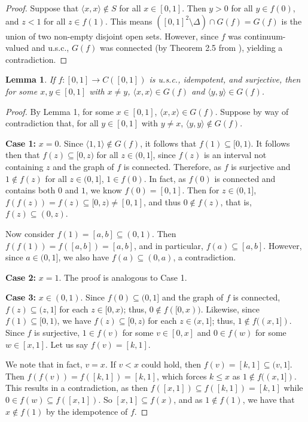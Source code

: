 \documentclass{amsart}
\newtheorem{lemma}[theorem]{Lemma}
\theoremstyle{definition}
\newcommand{\<}{\langle}
\renewcommand{\>}{\rangle}
\begin{document}
\begin{proof}
Suppose that $\<x,x\> \not\in S$ for all $x \in [0,1]$. Then $y > 0$ for all $y \in f(0)$, and $z < 1$ for all $z \in f(1)$. This means $([0,1]^2 \setminus \Delta) \cap G(f) = G(f)$ is the union of two non-empty disjoint open sets. However, since $f$ was continuum-valued and u.s.c., $G(f)$ was connected (by Theorem 2.5 from \cite{ingram intro}), yielding a contradiction.
\end{proof}

\begin{lemma}
If $f: [0,1] \rightarrow C([0,1])$ is u.s.c., idempotent, and surjective, then for some $x, y \in [0,1]$ with $x \not= y$, $\<x,x\> \in G(f)$ and $\<y,y\> \in G(f)$.
\end{lemma}

\begin{proof}
By Lemma 1, for some $x \in [0,1]$, $\<x,x\> \in G(f)$. Suppose by way of contradiction that, for all $y \in [0,1]$ with $y \not= x$, $\<y,y\> \not\in G(f)$.

\textbf{Case 1:}
$x = 0$. Since $\<1,1\> \not\in G(f)$, it follows that $f(1) \subseteq [0,1)$. It follows then that $f(z)\subseteq[0,z)$ for all $z\in(0,1]$, since $f(z)$ is an interval not containing $z$ and the graph of $f$ is connected. Therefore, as $f$ is surjective and $1 \not\in f(z)$ for all $z \in (0,1]$, $1 \in f(0)$. In fact, as $f(0)$ is connected and contains both $0$ and $1$, we know $f(0) = [0,1]$. Then for $z \in (0,1]$, $f(f(z))=f(z)\subseteq[0,z)\not=[0,1]$, and thus $0\not\in f(z)$, that is, $f(z)\subseteq(0,z)$.

Now consider $f(1)=[a,b]\subseteq(0,1)$. Then $f(f(1))=f([a,b])=[a,b]$, and in particular, $f(a)\subseteq[a,b]$. However, since $a\in(0,1]$, we also have $f(a)\subseteq(0,a)$, a contradiction.


\textbf{Case 2:}
$x = 1$. The proof is analogous to Case 1.


\textbf{Case 3:}
$x \in (0,1)$. Since $f(0) \subseteq (0,1]$ and the graph of $f$ is connected, $f(z) \subseteq (z,1]$ for each $z \in [0,x)$; thus, $0 \not\in f([0,x))$. Likewise,  since $f(1) \subseteq [0,1)$, we have $f(z) \subseteq [0,z)$ for each $z \in (x,1]$; thus, $1 \not\in f((x,1])$. Since $f$ is surjective,
$1\in f(v)$ for some $v\in[0,x]$ and $0\in f(w)$ for some $w\in[x,1]$. Let us say $f(v) = [k,1]$.

We note that in fact, $v=x$. If $v<x$ could hold, then $f(v)=[k,1]\subseteq(v,1]$. Then $f(f(v))=f([k,1])=[k,1]$, which forces $k\leq x$ as $1\not\in f((x,1])$. This results in a contradiction, as then $f([x,1])\subseteq f([k,1])=[k,1]$ while $0\in f(w)\subseteq f([x,1])$. So $[x,1]\subseteq f(x)$, and as $1\not\in f(1)$, we have that $x\not\in f(1)$ by the idempotence of $f$.


\end{proof}
\end{document}
